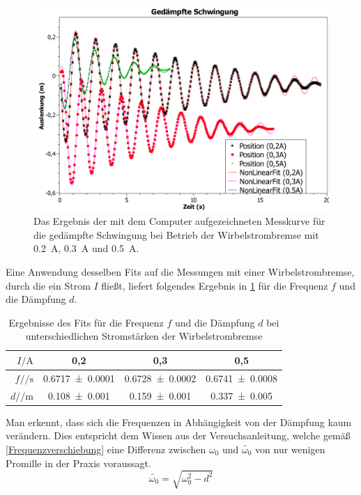 \documentclass[
	a4paper,
	12pt,
	pagesize,
	ngerman
]{scrartcl}
\begin{document}
	\begin{figure}[htb]
		\includegraphics[width=1\textwidth]{Gedaempfte_Schwingung_Graph}
		\centering
		\caption{Das Ergebnis der mit dem Computer aufgezeichneten Messkurve für die gedämpfte Schwingung bei Betrieb der Wirbelstrombremse mit \SI{0,2}{\ampere}, \SI{0,3}{\ampere} und \SI{0,5}{\ampere}.}
		\label{gedämpfte_Schwingung}
		\centering
	\end{figure}
	Eine Anwendung desselben Fits auf die Messungen mit einer Wirbelstrombremse, durch die ein Strom $ I $ fließt, liefert folgendes Ergebnis in \cref{gedaempftTab} für die Frequenz $ f $ und die Dämpfung $ d $.\\
	\begin{table}[htb]
		\centering
		\begin{tabular}{ r | c | c | c |}
			$I /\si{\ampere}$& 0,2 & 0,3 & 0,5\\ \hline
			$f  /\si{\per \second}$ & \num{0,6717 \pm 0,0001} & \num{0,6728 \pm 0,0002} & \num{0,6741 \pm 0,0008}\\
			$d /\si{\per \meter}  $ & \num{0,108 \pm 0,001} & \num{0,159 \pm 0,001} & \num{0,337 \pm 0,005}
		\end{tabular}
		\caption{Ergebnisse des Fits für die Frequenz $ f $ und die Dämpfung $ d $ bei unterschiedlichen Stromstärken der Wirbelstrombremse}
		\label{gedaempftTab}
	\end{table}
	Man erkennt, dass sich die Frequenzen in Abhängigkeit von der Dämpfung kaum verändern. Dies entspricht dem Wissen aus der Versuchsanleitung, welche gemäß \cref{Frequenzverschiebung} eine Differenz zwischen $ \omega_0 $ und $ \tilde{\omega_0} $ von nur wenigen Promille in der Praxis voraussagt.
	\begin{equation}
		\tilde{\omega_0} = \sqrt{\omega_0^2 - d^2}
		\label{Frequenzverschiebung}
	\end{equation}
\end{document}
